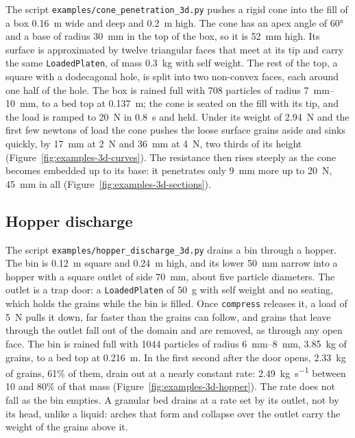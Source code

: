 The script \texttt{examples/cone\_penetration\_3d.py} pushes a rigid cone into the fill of a box \qty{0.16}{\metre} wide and deep and \qty{0.2}{\metre} high.
The cone has an apex angle of \ang{60} and a base of radius \qty{30}{\milli\metre} in the top of the box, so it is \qty{52}{\milli\metre} high.
Its surface is approximated by twelve triangular faces that meet at its tip and carry the same \texttt{LoadedPlaten}, of mass \qty{0.3}{\kilogram} with self weight.
The rest of the top, a square with a dodecagonal hole, is split into two non-convex faces, each around one half of the hole.
The box is rained full with \num{708} particles of radius \qtyrange{7}{10}{\milli\metre}, to a bed top at \qty{0.137}{\metre}; the cone is seated on the fill with its tip, and the load is ramped to \qty{20}{\newton} in \qty{0.8}{\second} and held.
Under its weight of \qty{2.94}{\newton} and the first few newtons of load the cone pushes the loose surface grains aside and sinks quickly, by \qty{17}{\milli\metre} at \qty{2}{\newton} and \qty{36}{\milli\metre} at \qty{4}{\newton}, two thirds of its height (Figure~\ref{fig:examples-3d-curves}).
The resistance then rises steeply as the cone becomes embedded up to its base: it penetrates only \qty{9}{\milli\metre} more up to \qty{20}{\newton}, \qty{45}{\milli\metre} in all (Figure~\ref{fig:examples-3d-sections}).

\subsection{Hopper discharge}

The script \texttt{examples/hopper\_discharge\_3d.py} drains a bin through a hopper.
The bin is \qty{0.12}{\metre} square and \qty{0.24}{\metre} high, and its lower \qty{50}{\milli\metre} narrow into a hopper with a square outlet of side \qty{70}{\milli\metre}, about five particle diameters.
The outlet is a trap door: a \texttt{LoadedPlaten} of \qty{50}{\gram} with self weight and no seating, which holds the grains while the bin is filled.
Once \texttt{compress} releases it, a load of \qty{5}{\newton} pulls it down, far faster than the grains can follow, and grains that leave through the outlet fall out of the domain and are removed, as through any open face.
The bin is rained full with \num{1044} particles of radius \qtyrange{6}{8}{\milli\metre}, \qty{3.85}{\kilo\gram} of grains, to a bed top at \qty{0.216}{\metre}.
In the first second after the door opens, \qty{2.33}{\kilo\gram} of grains, \num{61}\% of them, drain out at a nearly constant rate: \qty{2.49}{\kilo\gram\per\second} between \num{10} and \num{80}\% of that mass (Figure~\ref{fig:examples-3d-hopper}).
The rate does not fall as the bin empties.
A granular bed drains at a rate set by its outlet, not by its head, unlike a liquid: arches that form and collapse over the outlet carry the weight of the grains above it.

